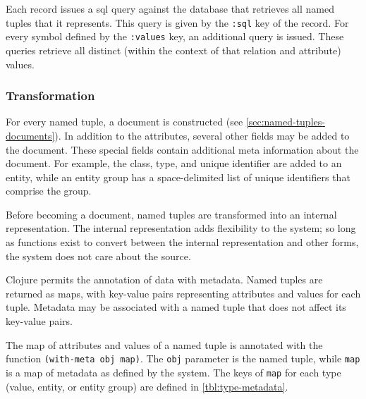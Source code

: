 			Each record issues a \gls{sql} query against the database that retrieves all named tuples that it represents.  This query is given by the \texttt{:sql} key of the record.  For every symbol defined by the \texttt{:values} key, an additional query is issued.  These queries retrieve all distinct (within the context of that relation and attribute) values.
		
		\subsubsection{Transformation}
			For every named tuple, a document is constructed (see \cref{sec:named-tuples-documents}).  In addition to the attributes, several other fields may be added to the document.  These special fields contain additional meta information about the document.  For example, the class, type, and unique identifier are added to an entity, while an entity group has a space-delimited list of unique identifiers that comprise the group.
			
			Before becoming a document, named tuples are transformed into an internal representation.  The internal representation adds flexibility to the system; so long as functions exist to convert between the internal representation and other forms, the system does not care about the source.
			
			Clojure permits the annotation of data with metadata.  Named tuples are returned as maps, with key-value pairs representing attributes and values for each tuple.  Metadata may be associated with a named tuple that does not affect its key-value pairs.
			
			The map of attributes and values of a named tuple is annotated with the function \texttt{(with-meta obj map)}.  The \texttt{obj} parameter is the named tuple, while \texttt{map} is a map of metadata as defined by the system.  The keys of \texttt{map} for each type (value, entity, or entity group) are defined in \vref{tbl:type-metadata}.
			
